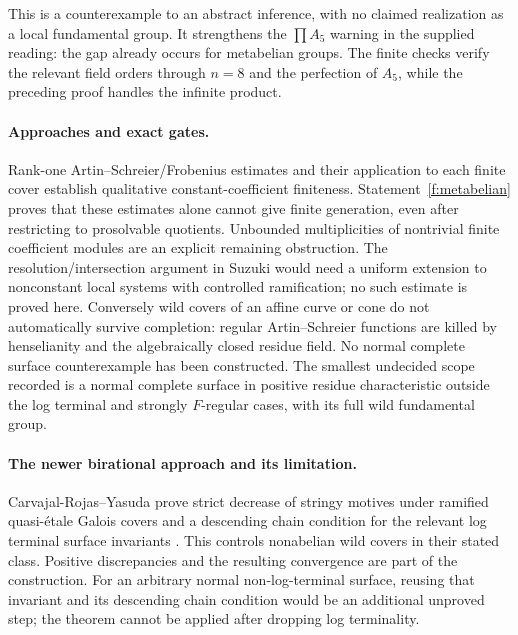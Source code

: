 This is a counterexample to an abstract inference, with no claimed
realization as a local fundamental group. It strengthens the
$\prod A_5$ warning in the supplied reading: the gap already occurs
for metabelian groups. The finite checks verify the relevant field
orders through $n=8$ and the perfection of $A_5$, while the preceding
proof handles the infinite product.

\paragraph{Approaches and exact gates.}
Rank-one Artin--Schreier/Frobenius estimates and their application to
each finite cover establish qualitative constant-coefficient
finiteness. Statement~\ref{f:metabelian} proves that these estimates
alone cannot give finite generation, even after restricting to
prosolvable quotients. Unbounded multiplicities of nontrivial finite
coefficient modules are an explicit remaining obstruction.
The resolution/intersection argument in Suzuki would need a uniform
extension to nonconstant local systems with controlled ramification;
no such estimate is proved here. Conversely wild covers of an affine
curve or cone do not automatically survive completion: regular
Artin--Schreier functions are killed by henselianity and the
algebraically closed residue field. No normal complete surface
counterexample has been constructed. The smallest undecided scope
recorded is a normal complete surface in positive residue
characteristic outside the log terminal and strongly $F$-regular
cases, with its full wild fundamental group.

\paragraph{The newer birational approach and its limitation.}
Carvajal-Rojas--Yasuda prove strict decrease of stringy motives
under ramified quasi-\'etale Galois covers and a descending chain
condition for the relevant log terminal surface invariants
\cite[Theorem 6.3 and Corollary 6.4, pp.~29--30]{CarvajalYasuda2025}.
This controls nonabelian wild covers in their stated class.
Positive discrepancies and the resulting convergence are
part of the construction. For an arbitrary normal non-log-terminal
surface, reusing that invariant and its descending chain condition
would be an additional unproved step; the theorem cannot be
applied after dropping log terminality.

